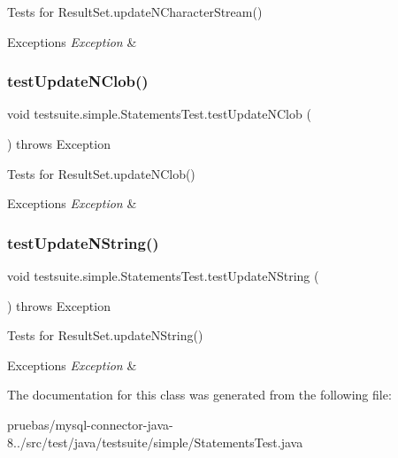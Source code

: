 Tests for Result\+Set.\+update\+N\+Character\+Stream()


\begin{DoxyExceptions}{Exceptions}
{\em Exception} & \\
\hline
\end{DoxyExceptions}
\mbox{\label{classtestsuite_1_1simple_1_1_statements_test_a659cc0e7a3ffc297310c1397fd769983}} 
\subsubsection{\texorpdfstring{test\+Update\+N\+Clob()}{testUpdateNClob()}}
{\footnotesize\ttfamily void testsuite.\+simple.\+Statements\+Test.\+test\+Update\+N\+Clob (\begin{DoxyParamCaption}{ }\end{DoxyParamCaption}) throws Exception}

Tests for Result\+Set.\+update\+N\+Clob()


\begin{DoxyExceptions}{Exceptions}
{\em Exception} & \\
\hline
\end{DoxyExceptions}
\mbox{\label{classtestsuite_1_1simple_1_1_statements_test_a4e41b5f592b49aa789051d554d859a7b}} 
\subsubsection{\texorpdfstring{test\+Update\+N\+String()}{testUpdateNString()}}
{\footnotesize\ttfamily void testsuite.\+simple.\+Statements\+Test.\+test\+Update\+N\+String (\begin{DoxyParamCaption}{ }\end{DoxyParamCaption}) throws Exception}

Tests for Result\+Set.\+update\+N\+String()


\begin{DoxyExceptions}{Exceptions}
{\em Exception} & \\
\hline
\end{DoxyExceptions}


The documentation for this class was generated from the following file\+:\begin{DoxyCompactItemize}
\item 
pruebas/mysql-\/connector-\/java-\/8../src/test/java/testsuite/simple/Statements\+Test.\+java\end{DoxyCompactItemize}
